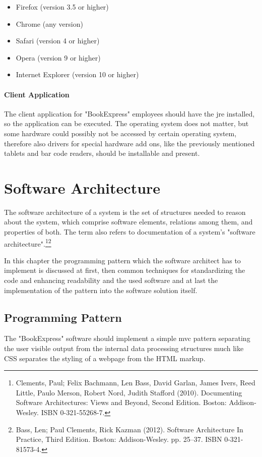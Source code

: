 \documentclass[11pt,a4paper,oneside,svgnames]{report}
\begin{document}
\begin{itemize}
	\item Firefox (version 3.5 or higher)
	\item Chrome (any version)
	\item Safari (version 4 or higher)
	\item Opera (version 9 or higher)
	\item Internet Explorer (version 10 or higher)
\end{itemize}
\subsubsection{Client Application}
The client application for "BookExpress" employees should have the \gls{jre} installed, so the application can be executed. The operating system does not matter, but some hardware could possibly not be accessed by certain operating system, therefore also drivers for special hardware add ons, like the previously mentioned tablets and bar code readers, should be installable and present.

\chapter{Software Architecture}
The software architecture of a system is the set of structures needed to reason about the system, which comprise software elements, relations among them, and properties of both. The term also refers to documentation of a system's "software architecture".\footnote{ Clements, Paul; Felix Bachmann, Len Bass, David Garlan, James Ivers, Reed Little, Paulo Merson, Robert Nord, Judith Stafford (2010). Documenting Software Architectures: Views and Beyond, Second Edition. Boston: Addison-Wesley. ISBN 0-321-55268-7.}\footnote{Bass, Len; Paul Clements, Rick Kazman (2012). Software Architecture In Practice, Third Edition. Boston: Addison-Wesley. pp. 25–37. ISBN 0-321-81573-4.}

In this chapter the programming pattern which the software architect has to implement is discussed at first, then common techniques for standardizing the code and enhancing readability and the used software and at last the implementation of the pattern into the software solution itself.

\section{Programming Pattern}
\label{sec:mvc-pattern}
The "BookExpress" software should implement a simple \gls{mvc} pattern separating the user visible output from the internal data processing structures much like CSS separates the styling of a webpage from the HTML markup.
\end{document}

